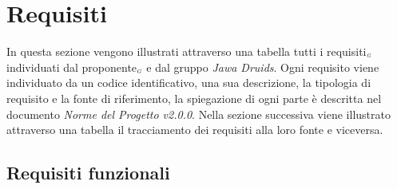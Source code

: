 \chapter{Requisiti}\label{Requisiti}
In questa sezione vengono illustrati attraverso una tabella tutti i requisiti$_{\scaleto{G}{3pt}}$ individuati dal proponente$_{\scaleto{G}{3pt}}$ e dal gruppo \textit{Jawa Druids}. Ogni requisito viene individuato da un codice identificativo, una sua descrizione, la tipologia di requisito e la fonte di riferimento, la spiegazione di ogni parte è descritta nel documento \textit{Norme del Progetto v2.0.0}. Nella sezione successiva viene illustrato attraverso una tabella il tracciamento dei requisiti alla loro fonte e viceversa.

\section{Requisiti funzionali}\label{RequisitiFunzionali}

